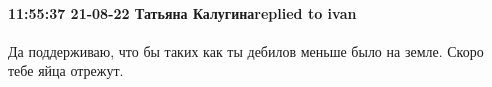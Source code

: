  
 
 
 
 

\paragraph{11:55:37 21-08-22 Татьяна Калугинаreplied to ivan}

Да поддерживаю, что бы таких как ты дебилов меньше было на земле. Скоро тебе
яйца отрежут.
